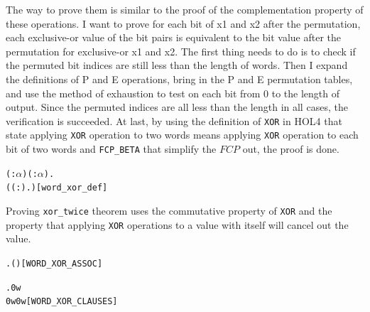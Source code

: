 \documentclass{article}
\begin{document}
The way to prove them is similar to the proof of the complementation property of these operations. I want to prove for each
bit of x1 and x2 after the permutation, each exclusive-or value of the bit pairs is equivalent to the bit value after the
permutation for exclusive-or x1 and x2. The first thing needs to do is to check if the permuted bit indices
are still less than the length of words. Then I expand the definitions of P and E operations, bring in the P and E permutation
tables, and use the method of exhaustion to test on each bit from 0 to the length of output. Since the permuted indices are all
less than the length in all cases, the verification is succeeded. At last, by using the definition of \verb|XOR| in HOL4 that
state applying \verb|XOR| operation to two words means applying \verb|XOR| operation to each bit of two words and \verb|FCP_BETA| that simplify
the $FCP$ out, the proof is done.

\begin{alltt}
  \HOLTokenTurnstile{} \HOLSymConst{\HOLTokenForall{}}( :\ensuremath{\alpha} ) ( :\ensuremath{\alpha} ).
      \HOLSymConst{\HOLTokenEor{}}  \HOLSymConst{=} (( :).    \HOLSymConst{\HOLTokenNotEquiv{}}   )\hfill{[word_xor_def]}
\end{alltt}

Proving \verb|xor_twice| theorem uses the commutative property of \verb|XOR| and the property that applying \verb|XOR| operations
to a value with itself will cancel out the value.

\begin{alltt}
  \HOLTokenTurnstile{} \HOLSymConst{\HOLTokenForall{}}  . ( \HOLSymConst{\HOLTokenEor{}} ) \HOLSymConst{\HOLTokenEor{}}  \HOLSymConst{=}  \HOLSymConst{\HOLTokenEor{}}  \HOLSymConst{\HOLTokenEor{}} \hfill{[WORD_XOR_ASSOC]}
\end{alltt}

\begin{alltt}
  \HOLTokenTurnstile{} \HOLSymConst{\HOLTokenForall{}}.  \HOLSymConst{\HOLTokenEor{}}  \HOLSymConst{=} \HOLSymConst{\HOLTokenNeg{}} \HOLSymConst{\HOLTokenConj{}}  \HOLSymConst{\HOLTokenEor{}}  \HOLSymConst{=} \HOLSymConst{\HOLTokenNeg{}} \HOLSymConst{\HOLTokenConj{}} 0w \HOLSymConst{\HOLTokenEor{}}  \HOLSymConst{=}  \HOLSymConst{\HOLTokenConj{}}
        \HOLSymConst{\HOLTokenEor{}} 0w \HOLSymConst{=}  \HOLSymConst{\HOLTokenConj{}}  \HOLSymConst{\HOLTokenEor{}}  \HOLSymConst{=} 0w\hfill{[WORD_XOR_CLAUSES]}
\end{alltt}
\end{document}
